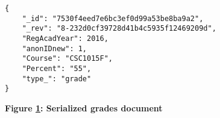 \begin{figure}[H]
    \centering
    \begin{mdframed}
        \centering
        \begin{verbatim}
{
    "_id": "7530f4eed7e6bc3ef0d99a53be8ba9a2",
    "_rev": "8-232d0cf39728d41b4c5935f12469209d",
    "RegAcadYear": 2016,
    "anonIDnew": 1,
    "Course": "CSC1015F",
    "Percent": "55",
    "type_": "grade"
}    
        \end{verbatim}
    \end{mdframed}
    \caption[Serialized grades document]{\textbf{Figure \ref{fig-json-grade}: Serialized grades document}}
    \label{fig-json-grade}
\end{figure}